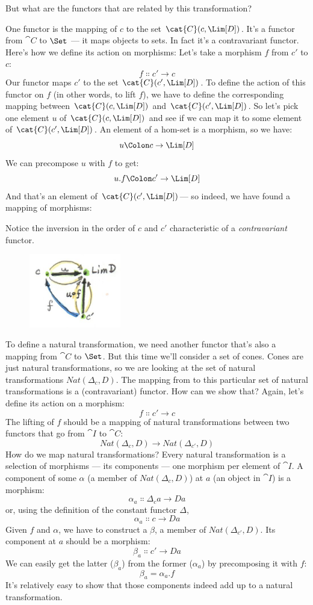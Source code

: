 But what are the functors that are related by this transformation?

One functor is the mapping of $c$ to the set
$\cat{C}(c, \Lim[D])$. It's a functor from $\cat{C}$ to $\Set$ ---
it maps objects to sets. In fact it's a contravariant functor. Here's
how we define its action on morphisms: Let's take a morphism $f$
from $c'$ to $c$:
\[f \Colon c' \to c\]
Our functor maps $c'$ to the set
$\cat{C}(c', \Lim[D])$. To define the action of this functor on
$f$ (in other words, to lift $f$), we have to define the
corresponding mapping between $\cat{C}(c, \Lim[D])$ and
$\cat{C}(c', \Lim[D])$. So let's pick one element $u$ of
$\cat{C}(c, \Lim[D])$ and see if we can map it to some element of
$\cat{C}(c', \Lim[D])$. An element of a hom-set is a morphism, so
we have:
\[u \Colon c \to \Lim[D]\]
We can precompose $u$ with $f$ to get:
\[u . f \Colon c' \to \Lim[D]\]
And that's an element of $\cat{C}(c', \Lim[D])$--- so indeed, we
have found a mapping of morphisms:


Notice the inversion in the order of $c$ and $c'$
characteristic of a \emph{contravariant} functor.

\begin{figure}[H]
\centering
\includegraphics[width=40mm]{images/homsetmapping.jpg}
\end{figure}

\noindent
To define a natural transformation, we need another functor that's also
a mapping from $\cat{C}$ to $\Set$. But this time we'll consider a
set of cones. Cones are just natural transformations, so we are looking
at the set of natural transformations $Nat(\Delta_c, D)$. The mapping
from  to this particular set of natural transformations is a
(contravariant) functor. How can we show that? Again, let's define its
action on a morphism:
\[f \Colon c' \to c\]
The lifting of $f$ should be a mapping of natural transformations
between two functors that go from $\cat{I}$ to $\cat{C}$:
\[Nat(\Delta_c, D) \to Nat(\Delta_{c'}, D)\]
How do we map natural transformations? Every natural transformation is a
selection of morphisms --- its components --- one morphism per element
of $\cat{I}$. A component of some $\alpha$ (a member of $Nat(\Delta_c, D)$) at
$a$ (an object in $\cat{I}$) is a morphism:
\[\alpha_a \Colon \Delta_c a \to D a\]
or, using the definition of the constant functor $\Delta$,
\[\alpha_a \Colon c \to D a\]
Given $f$ and $\alpha$, we have to construct a $\beta$, a member of
$Nat(\Delta_{c'}, D)$. Its component at $a$ should be a
morphism:
\[\beta_a \Colon c' \to D a\]
We can easily get the latter ($\beta_a$) from the former ($\alpha_a$) by precomposing it with
$f$:
\[\beta_a = \alpha_a . f\]
It's relatively easy to show that those components indeed add up to a
natural transformation.

